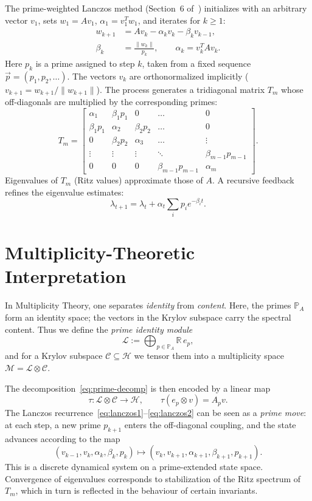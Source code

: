 \documentclass[12pt]{article}
\theoremstyle{plain}
\theoremstyle{definition}
\theoremstyle{remark}
\begin{document}
The prime-weighted Lanczos method (Section~6 of~\cite{vangelder2024}) initializes with an arbitrary vector $v_1$, sets $w_1 = A v_1$, $\alpha_1 = v_1^T w_1$, and iterates for $k\ge 1$:
\begin{align}
w_{k+1} &= A v_k - \alpha_k v_k - \beta_k v_{k-1}, \label{eq:lanczos1}\\
\beta_k &= \frac{\|w_k\|}{p_k}, \qquad \alpha_k = v_k^T A v_k. \label{eq:lanczos2}
\end{align}
Here $p_k$ is a prime assigned to step $k$, taken from a fixed sequence $\vec{p}=(p_1,p_2,\dots)$. 
The vectors $v_k$ are orthonormalized implicitly ($v_{k+1} = w_{k+1}/\|w_{k+1}\|$).
The process generates a tridiagonal matrix $T_m$ whose off-diagonals are multiplied by the corresponding primes:
\begin{equation}\label{eq:Tm}
T_m = \begin{bmatrix}
\alpha_1 & \beta_1 p_1 & 0 & \dots & 0\\
\beta_1 p_1 & \alpha_2 & \beta_2 p_2 & \dots & 0\\
0 & \beta_2 p_2 & \alpha_3 & \dots & \vdots\\
\vdots & \vdots & \vdots & \ddots & \beta_{m-1} p_{m-1}\\
0 & 0 & 0 & \beta_{m-1} p_{m-1} & \alpha_m
\end{bmatrix}.
\end{equation}
Eigenvalues of $T_m$ (Ritz values) approximate those of $A$. 
A recursive feedback refines the eigenvalue estimates:
\begin{equation}\label{eq:feedback}
\lambda_{t+1} = \lambda_t + \alpha_t \sum_i p_i e^{-\beta_i t}.
\end{equation}

\section{Multiplicity-Theoretic Interpretation}\label{sec:multiplicity}
In Multiplicity Theory, one separates \emph{identity} from \emph{content}. 
Here, the primes $\mathbb{P}_A$ form an identity space; the vectors in the Krylov subspace carry the spectral content.
Thus we define the \emph{prime identity module}
\[
\mathcal{L} := \bigoplus_{p\in\mathbb{P}_A} \mathbb{R}\, e_p,
\]
and for a Krylov subspace $\mathcal{C}\subseteq\mathcal{H}$ we tensor them into a multiplicity space $\mathcal{M} = \mathcal{L}\otimes\mathcal{C}$.

The decomposition~\eqref{eq:prime-decomp} is then encoded by a linear map
\[
\tau : \mathcal{L}\otimes\mathcal{C} \to \mathcal{H}, \qquad \tau(e_p\otimes v) = A_p v.
\]
The Lanczos recurrence~\eqref{eq:lanczos1}--\eqref{eq:lanczos2} can be seen as a \emph{prime move}: at each step, a new prime $p_{k+1}$ enters the off-diagonal coupling, and the state advances according to the map
\[
(v_{k-1}, v_k, \alpha_k, \beta_k, p_k) \mapsto (v_k, v_{k+1}, \alpha_{k+1}, \beta_{k+1}, p_{k+1}).
\]
This is a discrete dynamical system on a prime-extended state space. 
Convergence of eigenvalues corresponds to stabilization of the Ritz spectrum of $T_m$, which in turn is reflected in the behaviour of certain invariants.
\end{document}
